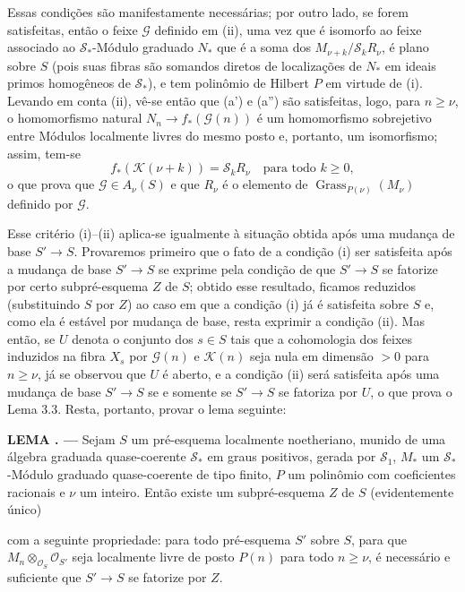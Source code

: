 \documentclass[11pt,twoside,openany]{book}
\numberwithin{equation}{section}
\newcommand{\src}[1]{%
  \phantomsection\hypertarget{src:#1}{}%
  \marginpar{\raggedleft\footnotesize\sffamily #1}%
}
\theoremstyle{plain}
\theoremstyle{definition}
\theoremstyle{remark}
\newcommand{\result}[2]{%
  \par\medskip\noindent\textbf{#1%
  \if\relax\detokenize{#2}\relax\else\space#2\fi. ---}\enspace
}
\newcommand{\FgaUnitKey}{frontmatter}
\renewcommand{\src}[1]{%
  \phantomsection\hypertarget{src:\FgaUnitKey:#1}{}%
  \marginpar{\raggedleft\footnotesize\sffamily #1}%
}
\begin{document}
Essas condições são manifestamente necessárias; por outro lado, se forem
satisfeitas, então o feixe $\mathcal G$ definido em (ii), uma vez que é
isomorfo ao feixe associado ao $\mathcal S_*$-Módulo graduado $N_*$ que é a
soma dos $M_{\nu+k}/\mathcal S_kR_\nu$, é plano sobre $S$ (pois suas fibras
são somandos diretos de localizações de $N_*$ em ideais primos homogêneos de
$\mathcal S_*$), e tem polinômio de Hilbert $P$ em virtude de (i). Levando em
conta (ii), vê-se então que (a') e (a'') são satisfeitas, logo, para
$n\geq\nu$, o homomorfismo natural $N_n\longrightarrow f_*(\mathcal G(n))$ é
um homomorfismo sobrejetivo entre Módulos localmente livres do mesmo posto e,
portanto, um isomorfismo; assim, tem-se
\[
f_*(\mathcal K(\nu+k))=\mathcal S_kR_\nu
\quad\text{para todo $k\geq0$},
\]
o que prova que $\mathcal G\in A_\nu(S)$ e que $R_\nu$ é o elemento de
$\operatorname{Grass}_{P(\nu)}(M_\nu)$ definido por $\mathcal G$.

Esse critério (i)--(ii) aplica-se igualmente à situação obtida após uma
mudança de base $S'\longrightarrow S$. Provaremos primeiro que o fato de a
condição (i) ser satisfeita após a mudança de base $S'\longrightarrow S$ se
exprime pela condição de que $S'\longrightarrow S$ se fatorize por certo
subpré-esquema $Z$ de $S$; obtido esse resultado, ficamos reduzidos
(substituindo $S$ por $Z$) ao caso em que a condição (i) já é satisfeita sobre
$S$ e, como ela é estável por mudança de base, resta exprimir a condição (ii).
Mas então, se $U$ denota o conjunto dos $s\in S$ tais que a cohomologia dos
feixes induzidos na fibra $X_s$ por $\mathcal G(n)$ e $\mathcal K(n)$ seja nula
em dimensão $>0$ para $n\geq\nu$, já se observou que $U$ é aberto, e a condição
(ii) será satisfeita após uma mudança de base $S'\longrightarrow S$ se e somente
se $S'\longrightarrow S$ se fatoriza por $U$, o que prova o Lema 3.3. Resta,
portanto, provar o lema seguinte:

\result{LEMA}{3.4} Sejam $S$ um pré-esquema localmente noetheriano, munido de
uma álgebra graduada quase-coerente $\mathcal S_*$ em graus positivos, gerada
por $\mathcal S_1$, $M_*$ um $\mathcal S_*$-Módulo graduado quase-coerente de tipo
finito, $P$ um polinômio com coeficientes racionais e $\nu$ um inteiro. Então
existe um subpré-esquema $Z$ de $S$ (evidentemente único)
\src{263}
com a seguinte propriedade: para todo pré-esquema $S'$ sobre $S$, para que
$M_n\otimes_{\mathcal O_S}\mathcal O_{S'}$ seja localmente livre de posto
$P(n)$ para todo $n\geq\nu$, é necessário e suficiente que
$S'\longrightarrow S$ se fatorize por $Z$.
\end{document}
